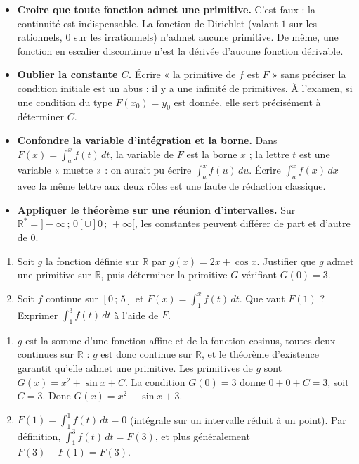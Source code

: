 \documentclass[11pt]{article}
\begin{document}
\begin{attention}
\begin{itemize}
\item \textbf{Croire que toute fonction admet une primitive.} C'est faux : la continuité est indispensable. La fonction de Dirichlet (valant $1$ sur les rationnels, $0$ sur les irrationnels) n'admet aucune primitive. De même, une fonction en escalier discontinue n'est la dérivée d'aucune fonction dérivable.
\item \textbf{Oublier la constante $C$.} Écrire « la primitive de $f$ est $F$ » sans préciser la condition initiale est un abus : il y a une infinité de primitives. À l'examen, si une condition du type $F(x_0) = y_0$ est donnée, elle sert précisément à déterminer $C$.
\item \textbf{Confondre la variable d'intégration et la borne.} Dans $F(x) = \int_a^x f(t)\,dt$, la variable de $F$ est la borne $x$ ; la lettre $t$ est une variable « muette » : on aurait pu écrire $\int_a^x f(u)\,du$. Écrire $\int_a^x f(x)\,dx$ avec la même lettre aux deux rôles est une faute de rédaction classique.
\item \textbf{Appliquer le théorème sur une réunion d'intervalles.} Sur $\mathbb{R}^* = ]-\infty\,;\,0[ \cup ]0\,;\,+\infty[$, les constantes peuvent différer de part et d'autre de $0$.
\end{itemize}
\end{attention}

\begin{exercice}
\begin{enumerate}
\item Soit $g$ la fonction définie sur $\mathbb{R}$ par $g(x) = 2x + \cos x$. Justifier que $g$ admet une primitive sur $\mathbb{R}$, puis déterminer la primitive $G$ vérifiant $G(0) = 3$.
\item Soit $f$ continue sur $[0\,;\,5]$ et $F(x) = \displaystyle\int_1^x f(t)\,dt$. Que vaut $F(1)$ ? Exprimer $\displaystyle\int_1^3 f(t)\,dt$ à l'aide de $F$.
\end{enumerate}
\end{exercice}

\begin{corrige}[Exercice]
\begin{enumerate}
\item $g$ est la somme d'une fonction affine et de la fonction cosinus, toutes deux continues sur $\mathbb{R}$ : $g$ est donc continue sur $\mathbb{R}$, et le théorème d'existence garantit qu'elle admet une primitive. Les primitives de $g$ sont $G(x) = x^2 + \sin x + C$. La condition $G(0) = 3$ donne $0 + 0 + C = 3$, soit $C = 3$. Donc $G(x) = x^2 + \sin x + 3$.
\item $F(1) = \displaystyle\int_1^1 f(t)\,dt = 0$ (intégrale sur un intervalle réduit à un point). Par définition, $\displaystyle\int_1^3 f(t)\,dt = F(3)$, et plus généralement $F(3) - F(1) = F(3)$.
\end{enumerate}
\end{corrige}
\end{document}
